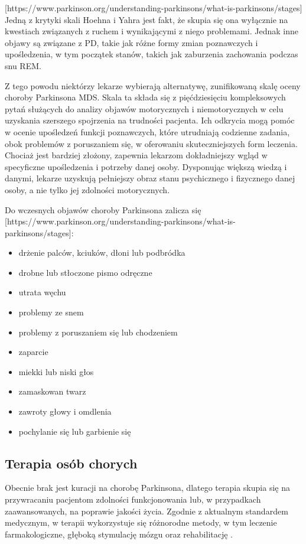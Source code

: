 [https://www.parkinson.org/understanding-parkinsons/what-is-parkinsons/stages]
Jedną z krytyki skali Hoehna i Yahra jest fakt, że skupia się ona wyłącznie na kwestiach związanych z ruchem i wynikającymi z niego problemami. Jednak inne objawy są związane z PD, takie jak różne formy zmian poznawczych i upośledzenia, w tym początek stanów, takich jak zaburzenia zachowania podczas snu REM.

Z tego powodu niektórzy lekarze wybierają alternatywę, zunifikowaną skalę oceny choroby Parkinsona MDS. Skala ta składa się z pięćdziesięciu kompleksowych pytań służących do analizy objawów motorycznych i niemotorycznych w celu uzyskania szerszego spojrzenia na trudności pacjenta.
Ich odkrycia mogą pomóc w ocenie upośledzeń funkcji poznawczych, które utrudniają codzienne zadania, obok problemów z poruszaniem się, w oferowaniu skuteczniejszych form leczenia.
Chociaż jest bardziej złożony, zapewnia lekarzom dokładniejszy wgląd w specyficzne upośledzenia i potrzeby danej osoby. Dysponując większą wiedzą i danymi, lekarze uzyskują pełniejszy obraz stanu psychicznego i fizycznego danej osoby, a nie tylko jej zdolności motorycznych.

Do wczesnych objawów choroby Parkinsona zalicza się [https://www.parkinson.org/understanding-parkinsons/what-is-parkinsons/stages]:
\begin{itemize}[itemsep=0.5pt]
	\item drżenie palców, kciuków, dłoni lub podbródka
	\item drobne lub stłoczone pismo odręczne
	\item utrata węchu
	\item problemy ze snem
	\item problemy z poruszaniem się lub chodzeniem
	\item zaparcie
	\item miekki lub niski głos
	\item zamaskowan twarz
	\item zawroty głowy i omdlenia
	\item pochylanie się lub garbienie się
\end{itemize}


\subsection{Terapia osób chorych}
\label{subsec:terapia}
Obecnie brak jest kuracji na chorobę Parkinsona, dlatego terapia skupia się na przywracaniu pacjentom zdolności funkcjonowania
lub, w przypadkach zaawansowanych, na poprawie jakości życia.
Zgodnie z aktualnym standardem medycznym, w terapii wykorzystuje się różnorodne metody, w tym leczenie farmakologiczne, głęboką stymulację mózgu oraz rehabilitację \cite{National_Institute_on_Aging_2022}.

